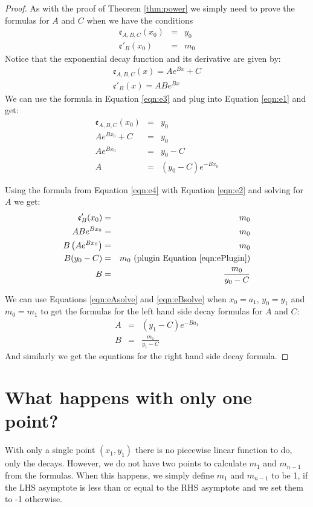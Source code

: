 \documentclass[10pt]{article}
\begin{document}
\begin{proof}
As with the proof of Theorem \ref{thm:power} we simply need to prove the
formulas for $A$ and $C$ when we have the conditions
\begin{eqnarray}
\mathfrak{e}_{A,B,C}(x_0) &=& y_0 \label{eqn:e1}\\
\mathfrak{e}'_{B}(x_0) &=& m_0 \label{eqn:e2}
\end{eqnarray}
Notice that the exponential decay function and its derivative are given by:
\begin{eqnarray}
\mathfrak{e}_{A,B,C}(x) = Ae^{Bx}+C \label{eqn:e3}\\
\mathfrak{e}'_{B}(x) = ABe^{Bx} \label{eqn:e4}
\end{eqnarray}
We can use the formula in Equation \ref{eqn:e3} and plug into Equation \ref{eqn:e1}
and get:
\begin{eqnarray}
\mathfrak{e}_{A,B,C}(x_0) &=& y_0 \\
Ae^{Bx_0} + C &=& y_0 \\
Ae^{Bx_0} &=& y_0 - C \label{eqn:ePlugin}\\
A&=&(y_0-C)e^{-Bx_0} \label{eqn:eAsolve}
\end{eqnarray}

Using the formula from Equation \ref{eqn:e4} with Equation \ref{eqn:e2} and
solving for $A$ we get:
\begin{eqnarray}
\mathfrak{e}'_{B}(x_0) &=& m_0 \\
ABe^{Bx_0} &=& m_0 \\
B \left(Ae^{Bx_0} \right)&=& m_0 \\
B(y_0-C) &=&m_0 \hbox{ (plugin Equation \ref{eqn:ePlugin})} \\
B &=& \frac{m_0}{y_0-C} \label{eqn:eBsolve}
\end{eqnarray}

We can use Equations \ref{eqn:eAsolve} and \ref{eqn:eBsolve} when $x_0=a_1$,
$y_0=y_1$ and $m_0=m_1$ to get the formulas for the left hand side decay formulas
for $A$ and $C$:
\begin{eqnarray*}
A&=&(y_1-C)e^{-Ba_1}\\
B &=& \frac{m_1}{y_1-C}
\end{eqnarray*}
And similarly we get the equations for the right hand side decay formula.
\end{proof}
\section{What happens with only one point?}
With only a single point $(x_1, y_1)$ there is no piecewise linear function to do,
only the decays.  However, we do not have two points to calculate $m_1$ and $m_{n-1}$
from the formulas.  When this happens, we simply define $m_1$ and $m_{n-1}$ to be 1, if
the LHS asymptote is less than or equal to the RHS asymptote and we set them to -1 otherwise.
\end{document}
